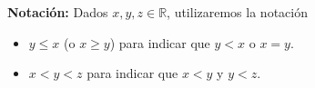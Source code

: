 \documentclass[11pt]{article}
\newcommand{\R}{\mathbb{R}}
\begin{document}
\textbf{Notación:} Dados $x,y,z\in \R$, utilizaremos la notación \begin{itemize}
 \item $y \leq x$ (o $x\geq y$) para indicar que $y<x$ o $x=y$.
 \item $x<y<z$ para indicar que $x<y$ y $y<z$.
\end{itemize}
%
\end{document}

